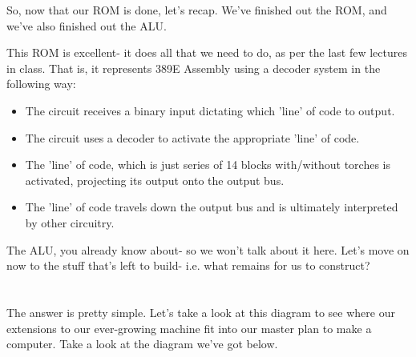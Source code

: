 \documentclass{article}
\begin{document}
So, now that our ROM is done, let's recap. We've finished out the ROM, and we've also finished out the ALU.

This ROM is excellent- it does all that we need to do, as per the last few lectures in class.
That is, it represents 389E Assembly using a decoder system in the following way:

\begin{itemize}
  \item The circuit receives a binary input dictating which 'line' of code to output.
  \item The circuit uses a decoder to activate the appropriate 'line' of code.
  \item The 'line' of code, which is just series of 14 blocks with/without torches is activated, projecting its output onto the output bus.
  \item The 'line' of code travels down the output bus and is ultimately interpreted by other circuitry.
\end{itemize}

The ALU, you already know about- so we won't talk about it here.
Let's move on now to the stuff that's left to build- i.e. what remains for us to construct?

\section{\selectfont{So, What's Left To Build?}}

The answer is pretty simple. 
Let's take a look at this diagram to see where our extensions to our ever-growing machine fit into our master plan to make a computer.
Take a look at the diagram we've got below.



\end{document}
